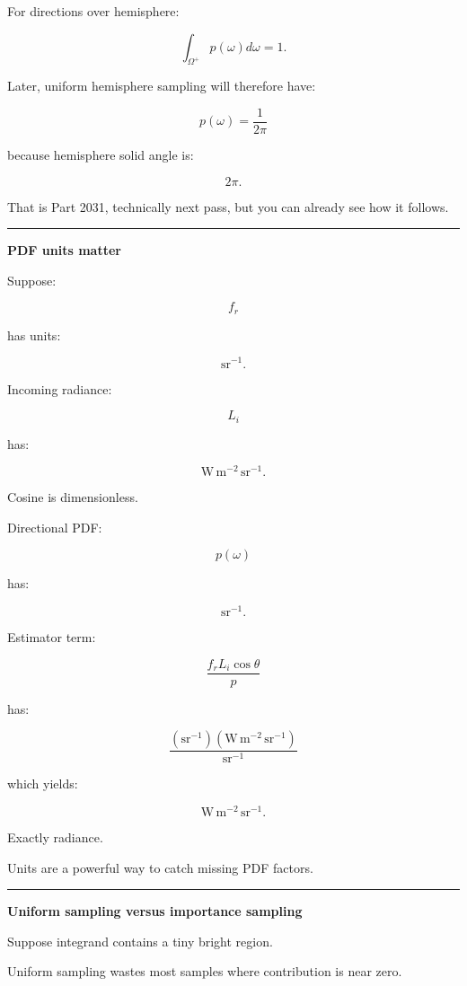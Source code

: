 For directions over hemisphere:

\[
\boxed{
\int_{\Omega^+}
p(\omega)d\omega
=
1.
}
\]

Later, uniform hemisphere sampling will therefore have:

\[
p(\omega)
=
\frac1{2\pi}
\]

because hemisphere solid angle is:

\[
2\pi.
\]

That is Part 2031, technically next pass, but you can already see how it follows.

\begin{center}\rule{0.5\linewidth}{0.5pt}\end{center}

\textbf{PDF units matter}

Suppose:

\[
f_r
\]

has units:

\[
\mathrm{sr}^{-1}.
\]

Incoming radiance:

\[
L_i
\]

has:

\[
\mathrm{W\,m^{-2}\,sr^{-1}}.
\]

Cosine is dimensionless.

Directional PDF:

\[
p(\omega)
\]

has:

\[
\mathrm{sr}^{-1}.
\]

Estimator term:

\[
\frac{
f_rL_i\cos\theta
}{
p
}
\]

has:

\[
\frac{
(\mathrm{sr}^{-1})
(\mathrm{W\,m^{-2}\,sr^{-1}})
}{
\mathrm{sr}^{-1}
}
\]

which yields:

\[
\mathrm{W\,m^{-2}\,sr^{-1}}.
\]

Exactly radiance.

Units are a powerful way to catch missing PDF factors.

\begin{center}\rule{0.5\linewidth}{0.5pt}\end{center}

\textbf{Uniform sampling versus importance sampling}

Suppose integrand contains a tiny bright region.

Uniform sampling wastes most samples where contribution is near zero.

